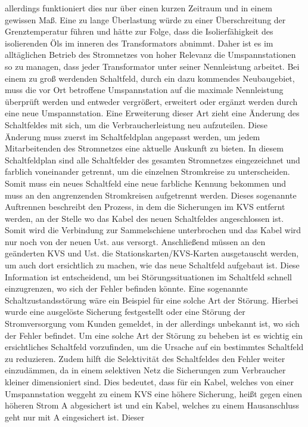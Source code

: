 allerdings funktioniert dies nur über einen kurzen Zeitraum und in einem gewissen Maß. Eine zu lange Überlastung würde zu einer Überschreitung der 
Grenztemperatur führen und hätte zur Folge, dass die Isolierfähigkeit des isolierenden Öls im inneren des Transformators abnimmt. %
Daher ist es im alltäglichen
Betrieb des Stromnetzes von hoher Relevanz die Umspannstationen so zu managen, dass jeder Transformator unter seiner Nennleistung arbeitet. Bei einem zu groß 
werdenden Schaltfeld, durch ein \zB dazu kommendes Neubaugebiet, muss die vor Ort betroffene Umspannstation auf die maximale Nennleistung überprüft werden 
und entweder vergrößert, erweitert oder ergänzt werden durch eine neue Umspannstation. Eine Erweiterung dieser Art zieht eine Änderung des Schaltfeldes
mit sich, um die Verbraucherleistung neu aufzuteilen. Diese Änderung muss zuerst im Schaltfeldplan angepasst werden, um jedem Mitarbeitenden des 
Stromnetzes eine aktuelle Auskunft zu bieten. In diesem Schaltfeldplan sind alle Schaltfelder des gesamten Stromnetzes eingezeichnet und farblich 
voneinander getrennt, um die einzelnen Stromkreise zu unterscheiden. Somit muss ein neues Schaltfeld eine neue farbliche Kennung bekommen und muss an 
den angrenzenden Stromkreisen aufgetrennt werden. Dieses sogenannte Auftrennen beschreibt den Prozess, in dem die Sicherungen im KVS entfernt werden, 
an der Stelle wo das Kabel des neuen Schaltfeldes angeschlossen ist. Somit wird die Verbindung zur Sammelschiene unterbrochen und das Kabel wird nur 
noch von der neuen Ust. aus versorgt. Anschließend müssen an den geänderten KVS und Ust. die Stationskarten/KVS-Karten ausgetauscht werden, um auch dort
ersichtlich zu machen, wie das neue Schaltfeld aufgebaut ist. Diese Information ist entscheidend, um bei Störungssituationen im Schaltfeld schnell 
einzugrenzen, wo sich der Fehler befinden könnte. Eine sogenannte Schaltzustandsstörung wäre ein Beispiel für eine solche Art der Störung. Hierbei wurde
eine ausgelöste Sicherung festgestellt oder eine Störung der Stromversorgung vom Kunden gemeldet, in der allerdings unbekannt ist, wo sich der Fehler 
befindet. Um eine solche Art der Störung zu beheben ist es wichtig ein ersichtliches Schaltfeld vorzufinden, um die Ursache auf ein bestimmtes Schaltfeld 
zu reduzieren. Zudem hilft die Selektivität des Schaltfeldes den Fehler weiter einzudämmen, da in einem selektiven Netz die Sicherungen zum Verbraucher
kleiner dimensioniert sind. Dies bedeutet, dass für ein Kabel, welches von einer Umspannstation weggeht zu einem KVS eine höhere Sicherung, heißt 
gegen einen höheren Strom  A abgesichert ist und ein Kabel, welches zu einem Hausanschluss geht nur mit  A eingesichert ist. Dieser 
